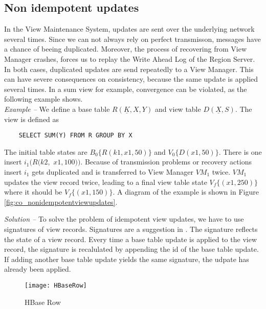 \documentclass[11pt,a4paper,bibtotoc,idxtotoc,headsepline,footsepline,footexclude,BCOR12mm,DIV13]{scrbook}
\begin{document}
 
\subsection{Non idempotent updates} 
\label{subsec:nonidempotentupdates}
In the View Maintenance System, updates are sent over the underlying network several times. Since we can not always rely on perfect transmisson, messages have a chance of beeing duplicated. Moreover, the process of recovering from View Manager crashes, forces us to replay the Write Ahead Log of the Region Server. In both cases, duplicated updates are send repeatedly to a View Manager. This can have severe consequences on consistency, because the same update is applied several times. In a sum view for example, convergence can be violated, as the following example shows.\\
 
\noindent 
\emph{Example -- }We define a base table $R(\underline{K},X,Y)$ and view table $D(\underline{X},S)$. The view is defined as
\begin{verbatim}
	SELECT SUM(Y) FROM R GROUP BY X
\end{verbatim}
The initial table states are $B_0\{R(k1,x1,50)\}$ and $V_0\{D(x1,50)\}$. There is one insert $i_1(R(k2,$ $x1,100))$. Because of transmission problems or recovery actions insert $i_1$ gets duplicated and is transferred to View Manager $VM_1$ twice. $VM_1$ updates the view record twice, leading to a final view table state $V_f\{(x1,250)\}$ where it should be $V_f\{(x1,150)\}$. A diagram of the example is shown in Figure \ref{fig:co_nonidempotentviewupdates}.

\noindent  
\emph{Solution -- }To solve the problem of idempotent view updates, we have to use signatures of view records. Signatures are a suggestion in \cite{jacobsen:viewmaintenance}. The signature reflects the state of a view record. Every time a base table update is applied to the view record, the signature is recalulated by appending the id of the base table update. If adding another base table update yields the same signature, the udpate has already been applied.


\begin{figure}[h!]
  
  \centering
    \texttt{[image: HBaseRow]}
    \caption{HBase Row}
    \label{fig:hbaserow}
\end{figure}
\end{document}
